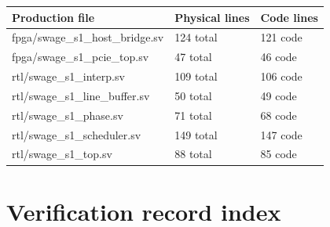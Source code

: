 \documentclass[11pt,a4paper]{article}
\begin{document}
{\small\renewcommand{\arraystretch}{1.18}\begin{longtable}{@{}L{0.55\textwidth}|L{0.18\textwidth}|L{0.18\textwidth}@{}}\toprule

\textbf{Production file} & \textbf{Physical lines} & \textbf{Code lines}\\\midrule\endhead

fpga/\allowbreak{}swage\_\allowbreak{}s1\_\allowbreak{}host\_\allowbreak{}bridge.sv & 124 total & 121 code\\[2pt]\hline

fpga/\allowbreak{}swage\_\allowbreak{}s1\_\allowbreak{}pcie\_\allowbreak{}top.sv & 47 total & 46 code\\[2pt]\hline

rtl/\allowbreak{}swage\_\allowbreak{}s1\_\allowbreak{}interp.sv & 109 total & 106 code\\[2pt]\hline

rtl/\allowbreak{}swage\_\allowbreak{}s1\_\allowbreak{}line\_\allowbreak{}buffer.sv & 50 total & 49 code\\[2pt]\hline

rtl/\allowbreak{}swage\_\allowbreak{}s1\_\allowbreak{}phase.sv & 71 total & 68 code\\[2pt]\hline

rtl/\allowbreak{}swage\_\allowbreak{}s1\_\allowbreak{}scheduler.sv & 149 total & 147 code\\[2pt]\hline

rtl/\allowbreak{}swage\_\allowbreak{}s1\_\allowbreak{}top.sv & 88 total & 85 code\\[2pt]\hline

\bottomrule\end{longtable}}

\section{Verification record index}
\end{document}
